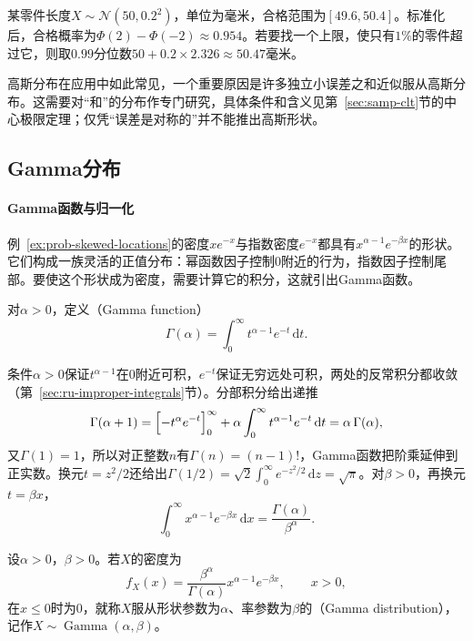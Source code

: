 \begin{example}[零件长度]
\label{ex:prob-gaussian-parts}
某零件长度$X\sim\mathcal{N}(50,0.2^2)$，单位为毫米，合格范围为$[49.6,50.4]$。标准化后，合格概率为$\Phi(2)-\Phi(-2)\approx0.954$。若要找一个上限，使只有$1\%$的零件超过它，则取$0.99$分位数$50+0.2\times2.326\approx50.47$毫米。
\end{example}

高斯分布在应用中如此常见，一个重要原因是许多独立小误差之和近似服从高斯分布。这需要对“和”的分布作专门研究，具体条件和含义见第~\ref{sec:samp-clt}节的中心极限定理；仅凭“误差是对称的”并不能推出高斯形状。

\subsection{Gamma分布}
\label{sec:prob-gamma}

\paragraph{Gamma函数与归一化}
例~\ref{ex:prob-skewed-locations}的密度$xe^{-x}$与指数密度$e^{-x}$都具有$x^{\alpha-1}e^{-\beta x}$的形状。它们构成一族灵活的正值分布：幂函数因子控制$0$附近的行为，指数因子控制尾部。要使这个形状成为密度，需要计算它的积分，这就引出Gamma函数。

\begin{definition}[Gamma函数]
\label{def:prob-gamma-function}
对$\alpha>0$，定义（Gamma function）
\[
  \Gamma(\alpha)=\int_0^\infty t^{\alpha-1}e^{-t}\,\mathrm{d}t .
\]
\end{definition}

条件$\alpha>0$保证$t^{\alpha-1}$在$0$附近可积，$e^{-t}$保证无穷远处可积，两处的反常积分都收敛（第~\ref{sec:ru-improper-integrals}节）。分部积分给出递推
\[
  \Gamma(\alpha+1)=\Bigl[-t^{\alpha}e^{-t}\Bigr]_0^\infty+\alpha\int_0^\infty t^{\alpha-1}e^{-t}\,\mathrm{d}t=\alpha\,\Gamma(\alpha),
\]
又$\Gamma(1)=1$，所以对正整数$n$有$\Gamma(n)=(n-1)!$，Gamma函数把阶乘延伸到正实数。换元$t=z^2/2$还给出$\Gamma(1/2)=\sqrt{2}\int_0^\infty e^{-z^2/2}\,\mathrm{d}z=\sqrt\pi$。对$\beta>0$，再换元$t=\beta x$，
\[
  \int_0^\infty x^{\alpha-1}e^{-\beta x}\,\mathrm{d}x=\frac{\Gamma(\alpha)}{\beta^\alpha}.
\]

\begin{definition}[Gamma分布]
\label{def:prob-gamma}
设$\alpha>0$，$\beta>0$。若$X$的密度为
\[
  f_X(x)=\frac{\beta^\alpha}{\Gamma(\alpha)}x^{\alpha-1}e^{-\beta x},\qquad x>0,
\]
在$x\leq0$时为$0$，就称$X$服从形状参数为$\alpha$、率参数为$\beta$的（Gamma distribution），记作$X\sim\operatorname{Gamma}(\alpha,\beta)$。
\end{definition}

